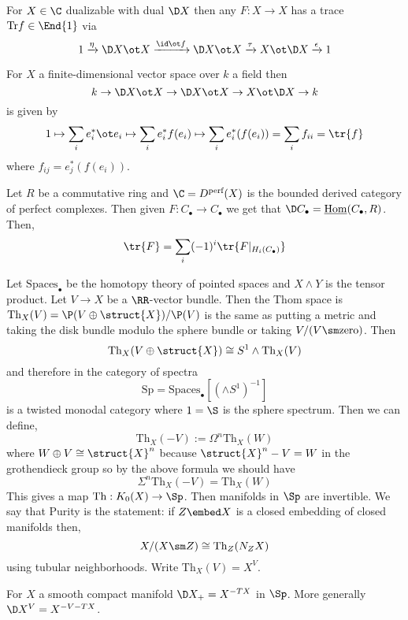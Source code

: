 \documentclass{article}
\newcommand{\Th}{\mathrm{Th}}
\begin{document}
For $X \in \C$ dualizable with dual $\D X$ then any $F : X \to X$ has a trace $\Tr{f} \in \End{1}$ via
\[ 1 \xrightarrow{\eta} \D X \ot X \xrightarrow{\id \ot f} \D X \ot X \xrightarrow{\tau} X \ot \D X \xrightarrow{\epsilon} 1 \]

\begin{example}
For $X$ a finite-dimensional vector space over $k$ a field then
\[ k \to \D X \ot X \to \D X \ot X \to X \ot \D X \to k \]
is given by
\[ 1 \mapsto \sum_i e_i^* \ot e_i \mapsto \sum_i e_i^* f(e_i) \mapsto \sum_i e_i^*(f(e_i)) = \sum_i f_{ii} = \tr{f} \]
where $f_{ij} = e_j^*(f(e_i))$. 
\end{example}

\begin{example}
Let $R$ be a commutative ring and $\C = D^{\text{perf}}(X)$ is the bounded derived category of perfect complexes. Then given $F : C_\bullet \to C_\bullet$ we get that $\D C_\bullet = \underline{\mathrm{Hom}}(C_\bullet, R)$. Then,
\[ \tr{F} = \sum_i (-1)^i \tr{F|_{H_i(C_\bullet)}} \] 
\end{example}


\begin{example}
Let $\mathrm{Spaces}_\bullet$ be the homotopy theory of pointed spaces and $X \wedge Y$ is the tensor product. Let $V \to X$ be a $\RR$-vector bundle. Then the Thom space is $\Th_X(V) = \P(V \oplus \struct{X}) / \P(V)$ is the same as putting a metric and taking the disk bundle modulo the sphere bundle or taking $V / (V \sm \text{zero})$. Then
\[ \Th_X(V \oplus \struct{X}) \cong S^1 \wedge \Th_X(V) \]
and therefore in the category of spectra
\[ \mathrm{Sp} = \mathrm{Spaces}_\bullet[(\wedge S^1)^{-1}] \]
is a twisted monodal category where $1 = \S$ is the sphere spectrum. Then we can define,
\[ \Th_X(-V) := \Omega^n \Th_X(W) \]
where $W \oplus V \cong \struct{X}^n$ because $\struct{X}^n - V = W$ in the grothendieck group so by the above formula we should have
\[ \Sigma^n \Th_X(-V) = \Th_X(W) \]
This gives a map $\Th : K_0(X) \to \Sp$. Then manifolds in $\Sp$ are invertible. We say that Purity is the statement: if $Z \embed X$ is a closed embedding of closed manifolds then,
\[ X / (X \sm Z) \cong \Th_Z(N_Z X) \]
using tubular neighborhoods. Write $\Th_X(V) = X^V$. 
\end{example}

\begin{theorem}
For $X$ a smooth compact manifold $\D X_{+} = X^{-TX}$ in $\Sp$. More generally $\D X^V = X^{-V - TX}$.
\end{theorem}
\end{document}
